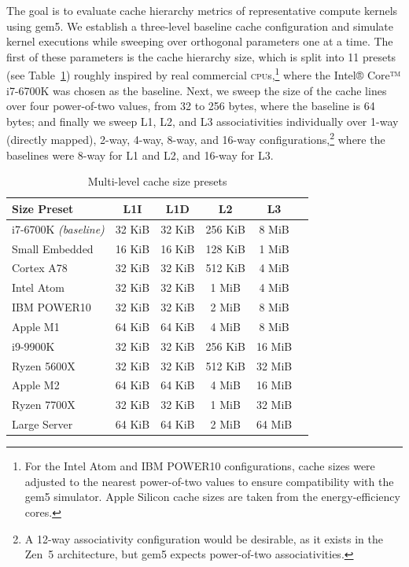 \documentclass[conference]{IEEEtran}
\begin{document}
The goal is to evaluate cache hierarchy metrics of representative compute
kernels using gem5. We establish a three-level baseline cache configuration and
simulate kernel executions while sweeping over orthogonal parameters one at a
time. The first of these parameters is the cache hierarchy size, which is split
into 11 presets (see Table~\ref{tbl:cachesizes}) roughly inspired by real
commercial \textsc{cpu}s,\footnote{For the Intel Atom and IBM POWER10
configurations, cache sizes were adjusted to the nearest power-of-two values to
ensure compatibility with the gem5 simulator. Apple Silicon cache
sizes are taken from the energy-efficiency cores.} where the Intel® Core™
i7-6700K was chosen as the baseline. Next, we sweep the size of the cache lines
over four power-of-two values, from 32 to 256 bytes, where the baseline is 64
bytes; and finally we sweep  L1, L2, and L3 associativities individually over
1-way (directly mapped), 2-way, 4-way, 8-way, and 16-way
configurations,\footnote{A 12-way associativity configuration would be
desirable, as it exists in the Zen~5 architecture, but gem5 expects
power-of-two associativities.} where the baselines were 8-way for L1 and L2,
and 16-way for L3.

\begin{table}[htbp]
	\centering
	\caption{Multi-level cache size presets}
	\label{tbl:cachesizes}
	\begin{tabular}{|l|c|c|c|c|c|}
		\hline
		\textbf{Size Preset}         & \textbf{L1I} & \textbf{L1D} & \textbf{L2} & \textbf{L3} \\
		\hline
		\hline
		i7-6700K \textit{(baseline)} & 32 KiB       & 32 KiB       & 256 KiB     & 8 MiB       \\
		Small Embedded               & 16 KiB       & 16 KiB       & 128 KiB     & 1 MiB       \\
		Cortex A78                   & 32 KiB       & 32 KiB       & 512 KiB     & 4 MiB       \\
		Intel Atom                   & 32 KiB       & 32 KiB       & 1 MiB       & 4 MiB       \\
		IBM POWER10                  & 32 KiB       & 32 KiB       & 2 MiB       & 8 MiB       \\
		Apple M1                     & 64 KiB       & 64 KiB       & 4 MiB       & 8 MiB       \\
		i9-9900K                     & 32 KiB       & 32 KiB       & 256 KiB     & 16 MiB      \\
		Ryzen 5600X                  & 32 KiB       & 32 KiB       & 512 KiB     & 32 MiB      \\
		Apple M2                     & 64 KiB       & 64 KiB       & 4 MiB       & 16 MiB      \\
		Ryzen 7700X                  & 32 KiB       & 32 KiB       & 1 MiB       & 32 MiB      \\
		Large Server                 & 64 KiB       & 64 KiB       & 2 MiB       & 64 MiB      \\
		\hline
	\end{tabular}
\end{table}
\end{document}
